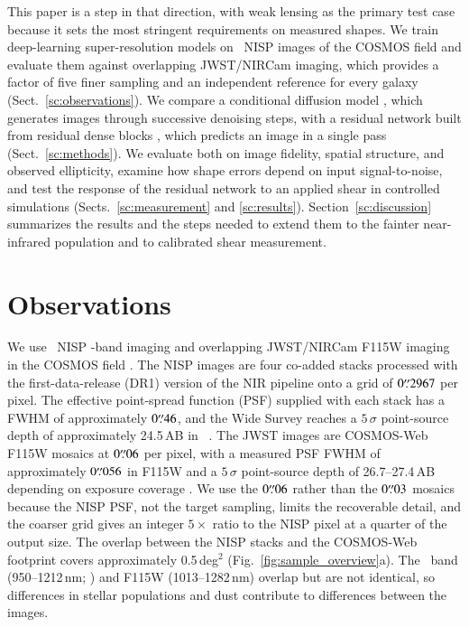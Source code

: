 \documentclass[longauth]{aa}
\begin{document}
This paper is a step in that direction, with weak lensing as the primary test case because it sets the most stringent requirements on measured shapes.
We train deep-learning super-resolution models on \Euclid\ NISP images of the COSMOS field and evaluate them against overlapping JWST/NIRCam imaging, which provides a factor of five finer sampling and an independent reference for every galaxy (Sect.~\ref{sc:observations}).
We compare a conditional diffusion model \citep{sohldickstein2015, Ho2020}, which generates images through successive denoising steps, with a residual network built from residual dense blocks \citep[RDB;][]{Zhang2018RDN, Wang2018}, which predicts an image in a single pass (Sect.~\ref{sc:methods}).
We evaluate both on image fidelity, spatial structure, and observed ellipticity, examine how shape errors depend on input signal-to-noise, and test the response of the residual network to an applied shear in controlled simulations (Sects.~\ref{sc:measurement} and \ref{sc:results}).
Section~\ref{sc:discussion} summarizes the results and the steps needed to extend them to the fainter near-infrared population and to calibrated shear measurement.

\section{\label{sc:observations}Observations}

We use \Euclid\ NISP \YE-band imaging \citep{EuclidSkyNISP} and overlapping JWST/NIRCam F115W imaging \citep{jwst_nircam} in the COSMOS field \citep{Scoville_2007}.
The NISP images are four co-added stacks processed with the first-data-release (DR1) version of the NIR pipeline \citep{DR1-TP003} onto a grid of $0\overset{\prime\prime}{.}2967$ per pixel.
The effective point-spread function (PSF) supplied with each stack has a FWHM of approximately $0\overset{\prime\prime}{.}46$, and the Wide Survey reaches a $5\,\sigma$ point-source depth of approximately 24.5\,AB in \YE\ \citep{EuclidSkyOverview}.
The JWST images are COSMOS-Web F115W mosaics \citep[version 0.8, preceding the public data release of][]{Franco2025} at $0\overset{\prime\prime}{.}06$ per pixel, with a measured PSF FWHM of approximately $0\overset{\prime\prime}{.}056$ in F115W \citep{Zhuang2024} and a $5\,\sigma$ point-source depth of 26.7--27.4\,AB depending on exposure coverage \citep{Franco2025}.
We use the $0\overset{\prime\prime}{.}06$ rather than the $0\overset{\prime\prime}{.}03$ mosaics because the NISP PSF, not the target sampling, limits the recoverable detail, and the coarser grid gives an integer $5\times$ ratio to the NISP pixel at a quarter of the output size.
The overlap between the NISP stacks and the COSMOS-Web footprint covers approximately 0.5\,deg$^2$ (Fig.~\ref{fig:sample_overview}a).
The \YE\ band (950--1212\,nm; \citealt{Schirmer-EP18}) and F115W (1013--1282\,nm) overlap but are not identical, so differences in stellar populations and dust contribute to differences between the images.
\end{document}

